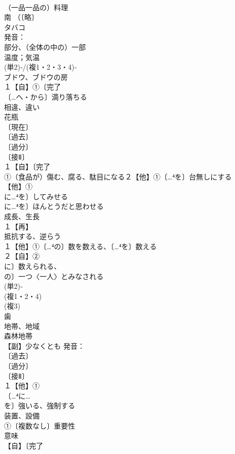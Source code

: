 \documentclass[8pt]{extreport}
\begin{document}
\begin{CJK}{UTF8}{min}
\\	（一品一品の）料理 
\\	南 （〔略〕
\\	タバコ 
\\	発音：
\\	部分、（全体の中の）一部 
\\	温度；気温 
\\	(単2)‐/(複1・2・3・4)‐
\\	ブドウ、ブドウの房 
\\	１【自】①〔完了
\\	〔…へ・から〕滴り落ちる 
\\	相違、違い 
\\	花瓶 
\\	〔現在〕
\\	〔過去〕
\\	〔過分〕
\\	〔接Ⅱ〕
\\	１【自】〔完了
\\	①（食品が）傷む、腐る、駄目になる２【他】①〔…⁴を〕台無しにする
\\	【他】①
\\	に…⁴を〕してみせる 
\\	に…⁴を〕ほんとうだと思わせる
\\	成長、生長 
\\	１【再】
\\	抵抗する、逆らう 
\\	１【他】①〔…⁴の〕数を数える、〔…⁴を〕数える 
\\	２【自】②
\\	に〕数えられる、
\\	の〕一つ〈一人〉とみなされる
\\	(単2)‐
\\	(複1・2・4)
\\	(複3)
\\	歯 
\\	地帯、地域 
\\	森林地帯
\\	【副】少なくとも 発音：
\\	〔過去〕
\\	〔過分〕
\\	〔接Ⅱ〕
\\	１【他】①
\\	〔…⁴に…
\\	を〕強いる、強制する 
\\	装置、設備
\\	①〔複数なし〕重要性 
\\	意味 
\\	【自】〔完了

\end{CJK}
\end{document}
